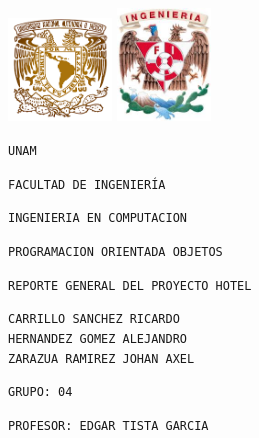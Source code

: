 \documentclass[a4paper,12pt]{article}
\begin{document}
\begin{flushleft}
\includegraphics[width=2.75cm]{unam.png}\hspace{8cm} \includegraphics[width=2.5cm]{fac.png}
\end{flushleft}

\begin{center}
\begin{Huge}
\texttt{UNAM}
\end{Huge}

\vspace{0.5cm}
\begin{LARGE}
\texttt{FACULTAD DE INGENIERÍA}

\vspace{0.5cm}
\texttt{INGENIERIA EN COMPUTACION}

\vspace{0.5cm}
\texttt{PROGRAMACION ORIENTADA OBJETOS}

\vspace{0.5cm}
\texttt{REPORTE GENERAL DEL PROYECTO HOTEL}

\vspace{1cm}
\end{LARGE}

\vspace{0.5cm}
\begin{LARGE}
\texttt{CARRILLO SANCHEZ RICARDO\\HERNANDEZ GOMEZ ALEJANDRO\\ZARAZUA RAMIREZ JOHAN AXEL}

\vspace{1cm}
\texttt{GRUPO: 04}

\vspace{1cm}
\texttt{PROFESOR: EDGAR TISTA GARCIA}
\end{LARGE}
\end{center}
\end{document}
